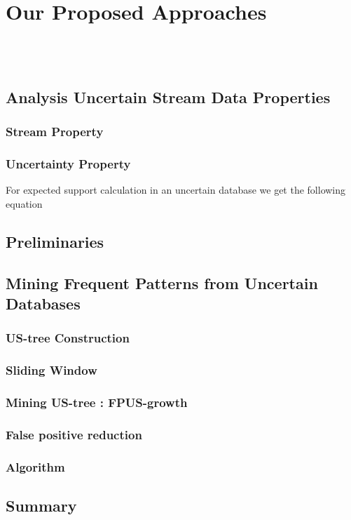 \documentclass[a4paper,12pt]{book}
\begin{document}
\tableofcontents
\chapter{Our Proposed Approaches}

\\ \\


\section{Analysis Uncertain Stream Data Properties}
\subsection{Stream Property}
\subsection{Uncertainty Property}
\noindent
For expected support calculation in an uncertain database we get the following equation\\

\section{Preliminaries}

\section{Mining Frequent Patterns from Uncertain Databases}
\subsection{US-tree Construction}
\subsection{Sliding Window}
\subsection{Mining US-tree : FPUS-growth}
\subsection{False positive reduction}
\subsection{Algorithm}
\section{Summary}
\end{document}
